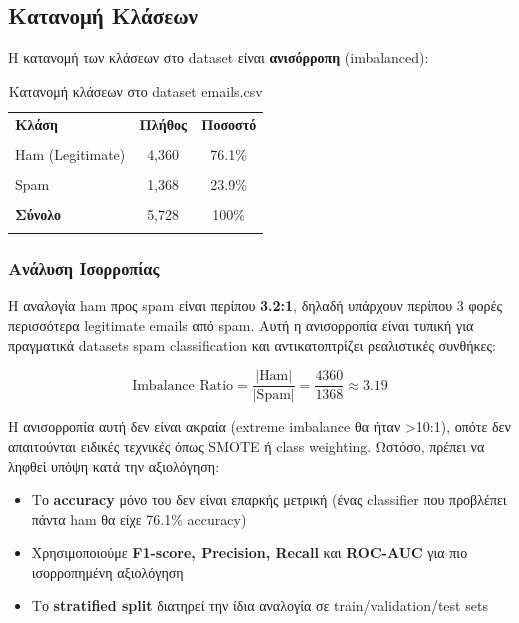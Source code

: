 \documentclass[12pt,a4paper,twoside]{book}
\begin{document}
\subsection{Κατανομή Κλάσεων}

Η κατανομή των κλάσεων στο dataset είναι \textbf{ανισόρροπη} (imbalanced):

\begin{table}[h]
    \centering
    \begin{tabular}{lcc}
        \hline
        \textbf{Κλάση}   & \textbf{Πλήθος} & \textbf{Ποσοστό} \\\\
        \hline
        Ham (Legitimate) & 4,360           & 76.1\%           \\\\
        Spam             & 1,368           & 23.9\%           \\\\
        \hline
        \textbf{Σύνολο}  & 5,728           & 100\%            \\\\
        \hline
    \end{tabular}
    \caption{Κατανομή κλάσεων στο dataset emails.csv}
\end{table}

\subsubsection*{Ανάλυση Ισορροπίας}

Η αναλογία ham προς spam είναι περίπου \textbf{3.2:1}, δηλαδή υπάρχουν περίπου 3 φορές περισσότερα legitimate emails από spam. Αυτή η ανισορροπία είναι τυπική για πραγματικά datasets spam classification και αντικατοπτρίζει ρεαλιστικές συνθήκες:

\begin{equation}
    \text{Imbalance Ratio} = \frac{|\text{Ham}|}{|\text{Spam}|} = \frac{4360}{1368} \approx 3.19
\end{equation}

Η ανισορροπία αυτή δεν είναι ακραία (extreme imbalance θα ήταν >10:1), οπότε δεν απαιτούνται ειδικές τεχνικές όπως SMOTE ή class weighting. Ωστόσο, πρέπει να ληφθεί υπόψη κατά την αξιολόγηση:

\begin{itemize}
    \item Το \textbf{accuracy} μόνο του δεν είναι επαρκής μετρική (ένας classifier που προβλέπει πάντα ham θα είχε 76.1\% accuracy)
    \item Χρησιμοποιούμε \textbf{F1-score, Precision, Recall} και \textbf{ROC-AUC} για πιο ισορροπημένη αξιολόγηση
    \item Το \textbf{stratified split} διατηρεί την ίδια αναλογία σε train/validation/test sets
\end{itemize}
\end{document}
